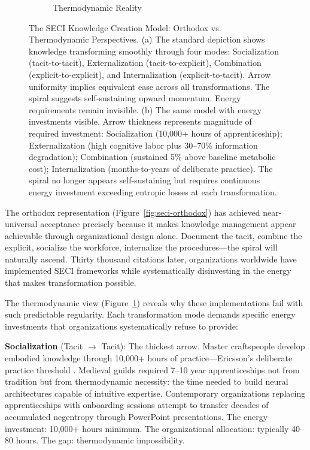 \begin{figure}[htbp]
\begin{subfigure}[b]{0.48\textwidth}
    \caption{Thermodynamic Reality}
    \label{fig:seci-thermodynamic}
\end{subfigure}
\caption{The SECI Knowledge Creation Model: Orthodox vs. Thermodynamic Perspectives. (a) The standard depiction shows knowledge transforming smoothly through four modes: Socialization (tacit-to-tacit), Externalization (tacit-to-explicit), Combination (explicit-to-explicit), and Internalization (explicit-to-tacit). Arrow uniformity implies equivalent ease across all transformations. The spiral suggests self-sustaining upward momentum. Energy requirements remain invisible. (b) The same model with energy investments visible. Arrow thickness represents magnitude of required investment: Socialization (10,000+ hours of apprenticeship); Externalization (high cognitive labor plus 30--70\% information degradation); Combination (sustained 5\% above baseline metabolic cost); Internalization (months-to-years of deliberate practice). The spiral no longer appears self-sustaining but requires continuous energy investment exceeding entropic losses at each transformation.}
\label{fig:seci-comparison}
\end{figure}

The orthodox representation (Figure~\ref{fig:seci-orthodox}) has achieved near-universal acceptance precisely because it makes knowledge management appear achievable through organizational design alone. Document the tacit, combine the explicit, socialize the workforce, internalize the procedures---the spiral will naturally ascend. Thirty thousand citations later, organizations worldwide have implemented SECI frameworks while systematically disinvesting in the energy that makes transformation possible.

The thermodynamic view (Figure~\ref{fig:seci-thermodynamic}) reveals why these implementations fail with such predictable regularity. Each transformation mode demands specific energy investments that organizations systematically refuse to provide:

\textbf{Socialization} (Tacit $\rightarrow$ Tacit): The thickest arrow. Master craftspeople develop embodied knowledge through 10,000+ hours of practice---Ericsson's deliberate practice threshold \citep{ericsson1993}. Medieval guilds required 7--10 year apprenticeships not from tradition but from thermodynamic necessity: the time needed to build neural architectures capable of intuitive expertise. Contemporary organizations replacing apprenticeships with onboarding sessions attempt to transfer decades of accumulated negentropy through PowerPoint presentations. The energy investment: 10,000+ hours minimum. The organizational allocation: typically 40--80 hours. The gap: thermodynamic impossibility.

